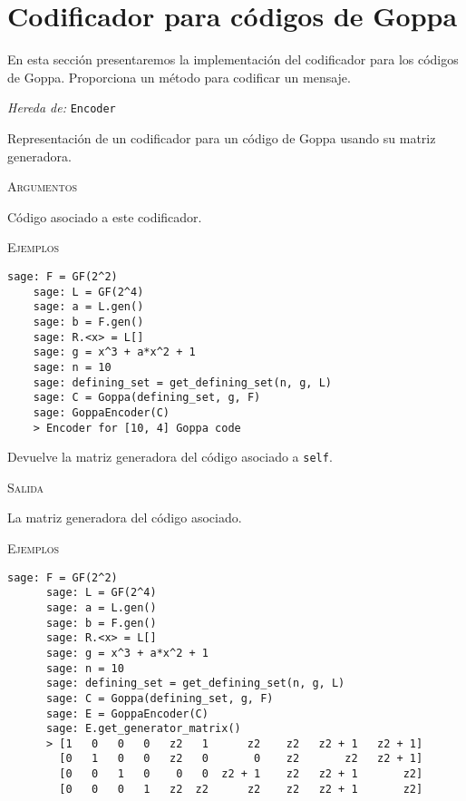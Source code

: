 \section{Codificador para códigos de Goppa}

En esta sección presentaremos la implementación del codificador para los códigos de Goppa. Proporciona un método para codificar un mensaje.

\begin{description}[leftmargin=1em, font=\normalfont\ttfamily, style=nextline]
\item[class GoppaEncoder(self, code)]

\emph{Hereda de:} \texttt{Encoder}

Representación de un codificador para un código de Goppa usando su matriz generadora.

\textsc{Argumentos}
\begin{description}[font=\normalfont\ttfamily]
  \item[code] Código asociado a este codificador.
\end{description}

\textsc{Ejemplos}
  \begin{lstlisting}[gobble=4]
    sage: F = GF(2^2)
    sage: L = GF(2^4)
    sage: a = L.gen()
    sage: b = F.gen()
    sage: R.<x> = L[]
    sage: g = x^3 + a*x^2 + 1
    sage: n = 10
    sage: defining_set = get_defining_set(n, g, L)
    sage: C = Goppa(defining_set, g, F)
    sage: GoppaEncoder(C)
    > Encoder for [10, 4] Goppa code
  \end{lstlisting}

  \begin{description}[font=\ttfamily, style=nextline]
    \item[get\_generator\_matrix(self)] Devuelve la matriz generadora del código asociado a \texttt{self}.
    
    \textsc{Salida}
    \begin{description}[font=\normalfont\ttfamily]
      \item[] La matriz generadora del código asociado.
    \end{description}

    \textsc{Ejemplos}
    \begin{lstlisting}[gobble=4]
      sage: F = GF(2^2)
      sage: L = GF(2^4)
      sage: a = L.gen()
      sage: b = F.gen()
      sage: R.<x> = L[]
      sage: g = x^3 + a*x^2 + 1
      sage: n = 10
      sage: defining_set = get_defining_set(n, g, L)
      sage: C = Goppa(defining_set, g, F)
      sage: E = GoppaEncoder(C)
      sage: E.get_generator_matrix()
      > [1   0   0   0   z2   1      z2    z2   z2 + 1   z2 + 1]
        [0   1   0   0   z2   0       0    z2       z2   z2 + 1]
        [0   0   1   0    0   0  z2 + 1    z2   z2 + 1       z2]
        [0   0   0   1   z2  z2      z2    z2   z2 + 1       z2]
    \end{lstlisting}


\end{description}
\end{description}
